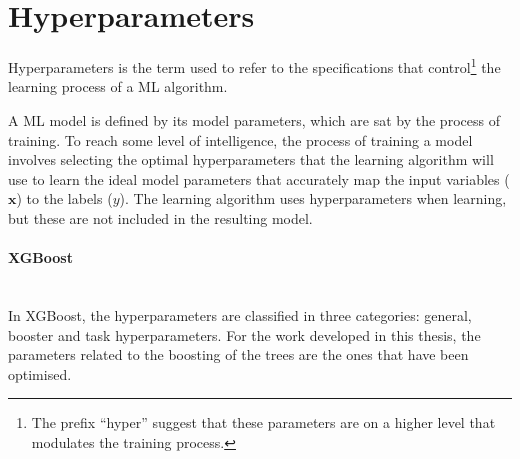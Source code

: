 



\section{Hyperparameters}
\label{fig:Appendix:BDT:Hyperparams}
Hyperparameters is the term used to refer to the specifications that control\footnote{The prefix ``hyper'' suggest that 
these parameters are on a higher level that modulates the training process.}
 the learning process of a ML algorithm. 

A ML model is defined by its model parameters, which are sat by the process of training. 
To reach some level of intelligence, the process of training a model involves 
selecting the optimal hyperparameters that the learning algorithm will use to learn the
ideal model parameters that accurately map the input variables ($\bm{x}$) to the labels ($y$).
The learning algorithm uses hyperparameters when learning, but these are not included 
in the resulting model. 


\paragraph{XGBoost}\mbox{}\\
In XGBoost, the hyperparameters are classified in three categories: general, booster and task hyperparameters.
For the work developed in this thesis, the parameters related to the boosting of the trees are the ones
that have been optimised. %

